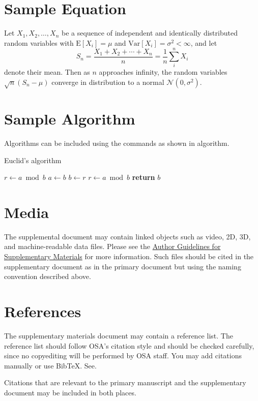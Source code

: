 \documentclass[9pt]{osa-supplemental-document}
\begin{document}
\section{Sample Equation}

Let $X_1, X_2, \ldots, X_n$ be a sequence of independent and identically distributed random variables with $\text{E}[X_i] = \mu$ and $\text{Var}[X_i] = \sigma^2 < \infty$, and let
\begin{equation}
S_n = \frac{X_1 + X_2 + \cdots + X_n}{n}
      = \frac{1}{n}\sum_{i}^{n} X_i
\label{eq:refname1}
\end{equation}
denote their mean. Then as $n$ approaches infinity, the random variables $\sqrt{n}(S_n - \mu)$ converge in distribution to a normal $\mathcal{N}(0, \sigma^2)$.

\section{Sample Algorithm}

Algorithms can be included using the commands as shown in algorithm.

\begin{algorithm}
\caption{Euclid’s algorithm}\label{alg:euclid}
\begin{algorithmic}[1]
\State $r\gets a\bmod b$
\State $a\gets b$
\State $b\gets r$
\State $r\gets a\bmod b$
\EndWhile\label{euclidendwhile}
\State \textbf{return} $b$
\EndProcedure
\end{algorithmic}
\end{algorithm}

\section*{Media}

The supplemental document may contain linked objects such as video, 2D, 3D, and machine-readable data files. Please see the \href{https://www.opticsinfobase.org/submit/style/supplementary_materials.cfm}{Author Guidelines for Supplementary Materials} for more information. Such files should be cited in the supplementary document as in the primary document but using the naming convention described above.

\section*{References} 

The supplementary materials document may contain a reference list. The reference list should follow OSA's citation style and should be checked carefully, since no copyediting will be performed by OSA staff. You may add citations manually or use BibTeX. See.

Citations that are relevant to the primary manuscript and the supplementary document may be included in both places.

%
\end{document}
